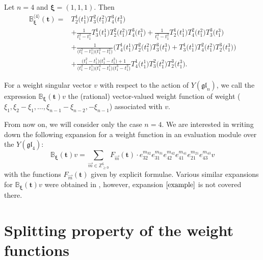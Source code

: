 \documentclass[pdftex]{sigma}
\numberwithin{equation}{section}
\begin{document}
\begin{Example} Let $n=4$ and $\boldsymbol{\xi}=(1,1,1)$. Then
\begin{align*}
{\mathbb{B}}_{\boldsymbol{\xi}}^{\langle 4\rangle}(\boldsymbol{t})={}& T^1_{2}\bigl(t_{1}^{1}\bigr) T^2_{3}\bigl(t_{1}^{2}\bigr) T^3_{4}\bigl(t_{1}^{3}\bigr) \\
&{+}\frac{1}{t_{1}^{2}-t_{1}^{1}} T^1_{3}\bigl(t_{1}^{1}\bigr) T^2_{2}\bigl(t_{1}^{2}\bigr) T^3_{4}\bigl(t_{1}^{3}\bigr)+\frac{1}{t_{1}^{3}-t_{1}^{2}} T^1_{2}\bigl(t_{1}^{1}\bigr) T^2_{4}\bigl(t_{1}^{2}\bigr) T^3_{3}\bigl(t_{1}^{3}\bigr) \\
&{+}\frac{1}{\bigl(t_{1}^{2}-t_{1}^{1}\bigr)\bigl(t_{1}^{3}-t_{1}^{2}\bigr)}\bigl(T^1_{4}\bigl(t_{1}^{1}\bigr) T^2_{2}\bigl(t_{1}^{2}\bigr) T^3_{3}\bigl(t_{1}^{3}\bigr)+T^1_{3}\bigl(t_{1}^{1}\bigr) T^2_{4}\bigl(t_{1}^{2}\bigr) T^3_{2}\bigl(t_{1}^{3}\bigr)\bigr) \\
&{+}\frac{\bigl(t_{1}^{2}-t_{1}^{1}\bigr)\bigl(t_{1}^{3}-t_{1}^{2}\bigr)+1}{\bigl(t_{1}^{2}-t_{1}^{1}\bigr)\bigl(t_{1}^{3}-t_{1}^{1}\bigr)\bigl(t_{1}^{3}-t_{1}^{2}\bigr)} T^1_{4}\bigl(t_{1}^{1}\bigr) T^2_{3}\bigl(t_{1}^{2}\bigr) T^3_{2}\bigl(t_{1}^{3}\bigr).
\end{align*}\end{Example}

For a weight singular vector $v$ with respect to the action of $Y(\mathfrak{gl}_n)$, we call the expression $\mathbb{B}_{\boldsymbol{\xi}}(\boldsymbol{t})v$ the (rational) vector-valued weight function of weight ($\xi_1,\xi_2-\xi_1,\dots,\xi_{n-1}-\xi_{n-2},-\xi_{n-1}$) associated with $v$.

From now on, we will consider only the case $n=4$. We are interested in writing down the following expansion for a weight function in an evaluation module over the $Y(\mathfrak{gl}_4)$:
\begin{equation}\label{example}
{\mathbb{B}}_{\boldsymbol{\xi}}(\boldsymbol{t})v=\sum\limits_{\vec{m}\in\mathbb{Z}_{\geq 0}^6} F_{\vec{m}}(\boldsymbol{t})\cdot e^{m_{32}}_{32}e^{m_{31}}_{31}e^{m_{42}}_{42}e^{m_{41}}_{41}e^{m_{21}}_{21}e^{m_{43}}_{43} v
\end{equation}
with the functions $F_{\vec{m}}(\boldsymbol{t})$ given by explicit formulae. Various
similar expansions for $ {\mathbb{B}}_{\boldsymbol{\xi}}(\boldsymbol{t})v$ were obtained in \cite{TVC}, however, expansion $\eqref{example}$ is not covered there.

\section{Splitting property of the weight functions}
\end{document}
